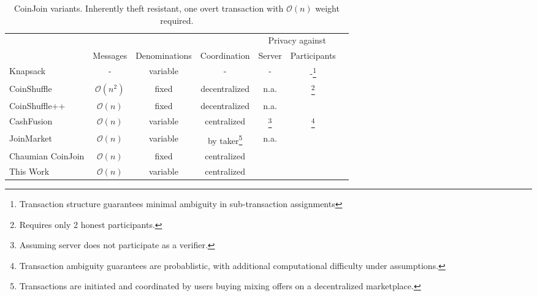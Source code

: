 \documentclass[a4paper]{article}
\renewcommand*{\thefootnote}{\arabic{footnote}}
\newcommand{\cmark}{\ding{51}}%
\begin{document}
\begin{table}[h!]
\begin{minipage}{\textwidth}
\renewcommand{\thempfootnote}{\fnsymbol{mpfootnote}}
\renewcommand{\thefootnote}{\thempfootnote} %
\centering
\begin{tabular}{lcccccc}
	&&&& \multicolumn{2}{c}{Privacy against}  \\
	&Messages & Denominations & Coordination & Server & Participants \\

	Knapsack~\cite{maurer2017anonymous} & - & variable & - & - & -\footnote{Transaction structure guarantees minimal ambiguity in sub-transaction assignments} \\
	CoinShuffle~\cite{ruffing2014coinshuffle} &$\mathcal{O}(n^2)$ & fixed & decentralized & n.a. & \cmark\footnote{Requires only 2 honest participants.} \\
	CoinShuffle++~\cite{ruffing2017p2p} & $\mathcal{O}(n)$ & fixed & decentralized & n.a. & \cmark\footnotemark[\value{footnote}] \\
	CashFusion & $\mathcal{O}(n)$ & variable & centralized & \cmark\footnote{Assuming server does not participate as a verifier.} & \cmark\footnote{Transaction ambiguity guarantees are probablistic, with additional computational difficulty under assumptions.} \\
	JoinMarket & $\mathcal{O}(n)$ & variable & by taker\footnote{Transactions are initiated and coordinated by users buying mixing offers on a decentralized marketplace.} & n.a.\footnotemark[\value{footnote}] & \cmark \\
	Chaumian CoinJoin & $\mathcal{O}(n)$ & fixed & centralized & \cmark & \cmark \\
	This Work & $\mathcal{O}(n)$ & variable & centralized & \cmark & \cmark \\
\end{tabular}
\end{minipage}
\caption{CoinJoin variants. Inherently theft resistant, one overt transaction with $\mathcal{O}(n)$ weight required.}
\label{table:coinjoin}
\end{table}
\end{document}
